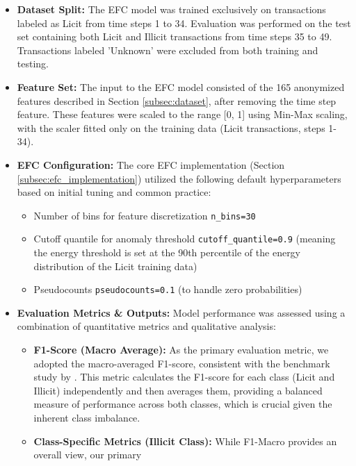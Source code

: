 \documentclass[12pt]{article}
\begin{document}
\begin{itemize}
    \item \textbf{Dataset Split:} The EFC model was trained exclusively on transactions labeled as Licit from time steps
      1 to 34. Evaluation was performed on the test set containing both Licit and Illicit transactions from time steps
      35 to 49. Transactions labeled 'Unknown' were excluded from both training and testing.
    \item \textbf{Feature Set:} The input to the EFC model consisted of the 165 anonymized features described in Section
      \ref{subsec:dataset}, after removing the time step feature. These features were scaled to the range [0, 1] using
      Min-Max scaling, with the scaler fitted only on the training data (Licit transactions, steps 1-34).
    \item \textbf{EFC Configuration:} The core EFC implementation (Section \ref{subsec:efc_implementation}) utilized the
      following default hyperparameters based on initial tuning and common practice:
        \begin{itemize}
            \item Number of bins for feature discretization \texttt{n\_bins=30}
            \item Cutoff quantile for anomaly threshold \texttt{cutoff\_quantile=0.9} (meaning the energy threshold is set at
              the 90th percentile of the energy distribution of the Licit training data)
            \item Pseudocounts \texttt{pseudocounts=0.1} (to handle zero probabilities)
        \end{itemize}
        \item \textbf{Evaluation Metrics \& Outputs:} Model performance was assessed using a combination of quantitative
          metrics and qualitative analysis:
          \begin{itemize}
              \item \textbf{F1-Score (Macro Average):} As the primary evaluation metric, we adopted the macro-averaged F1-score,
                consistent with the benchmark study by \cite{lorenz2021machinelearningmethodsdetect}. This metric calculates the
                F1-score for each class (Licit and Illicit) independently and then averages them, providing a balanced measure
                of performance across both classes, which is crucial given the inherent class imbalance.
              \item \textbf{Class-Specific Metrics (Illicit Class):} While F1-Macro provides an overall view, our primary

\end{itemize}
\end{itemize}
\end{document}
